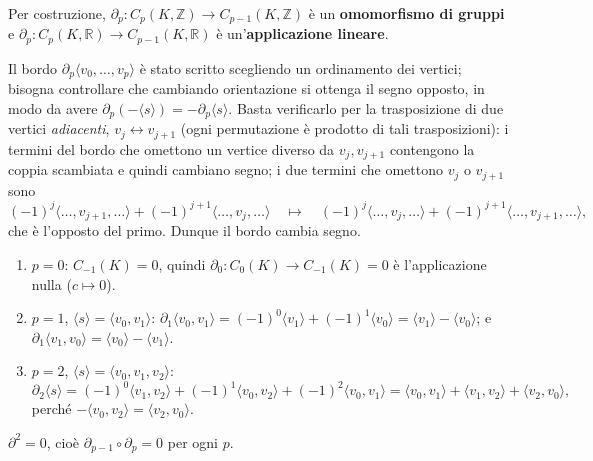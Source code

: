 Per costruzione, $\partial_p: C_p(K, \mathbb{Z}) \to C_{p-1}(K, \mathbb{Z})$ \`e un \textbf{omomorfismo di gruppi} e $\partial_p: C_p(K, \mathbb{R}) \to C_{p-1}(K, \mathbb{R})$ \`e un'\textbf{applicazione lineare}.

\begin{observacion}
Il bordo $\partial_p \langle v_0, \dots, v_p \rangle$ \`e stato scritto scegliendo un ordinamento dei vertici; bisogna controllare che cambiando orientazione si ottenga il segno opposto, in modo da avere $\partial_p(-\langle s \rangle) = -\partial_p \langle s \rangle$. Basta verificarlo per la trasposizione di due vertici \emph{adiacenti}, $v_j \leftrightarrow v_{j+1}$ (ogni permutazione \`e prodotto di tali trasposizioni): i termini del bordo che omettono un vertice diverso da $v_j, v_{j+1}$ contengono la coppia scambiata e quindi cambiano segno; i due termini che omettono $v_j$ o $v_{j+1}$ sono
\[
(-1)^j \langle \dots, v_{j+1}, \dots \rangle + (-1)^{j+1} \langle \dots, v_j, \dots \rangle \quad \longmapsto \quad (-1)^j \langle \dots, v_j, \dots \rangle + (-1)^{j+1} \langle \dots, v_{j+1}, \dots \rangle ,
\]
che \`e l'opposto del primo. Dunque il bordo cambia segno.
\end{observacion}

\begin{ejemplo}
\begin{enumerate}
    \item $p = 0$: $C_{-1}(K) = 0$, quindi $\partial_0: C_0(K) \to C_{-1}(K) = 0$ \`e l'applicazione nulla ($c \mapsto 0$).
    \item $p = 1$, $\langle s \rangle = \langle v_0, v_1 \rangle$: $\partial_1 \langle v_0, v_1 \rangle = (-1)^0 \langle v_1 \rangle + (-1)^1 \langle v_0 \rangle = \langle v_1 \rangle - \langle v_0 \rangle$; e $\partial_1 \langle v_1, v_0 \rangle = \langle v_0 \rangle - \langle v_1 \rangle$.
    \item $p = 2$, $\langle s \rangle = \langle v_0, v_1, v_2 \rangle$:
    \[
    \partial_2 \langle s \rangle = (-1)^0 \langle v_1, v_2 \rangle + (-1)^1 \langle v_0, v_2 \rangle + (-1)^2 \langle v_0, v_1 \rangle = \langle v_0, v_1 \rangle + \langle v_1, v_2 \rangle + \langle v_2, v_0 \rangle,
    \]
    perch\'e $-\langle v_0, v_2 \rangle = \langle v_2, v_0 \rangle$.
\end{enumerate}
\end{ejemplo}

\begin{lema}
$\partial^2 = 0$, cio\`e $\partial_{p-1} \circ \partial_p = 0$ per ogni $p$.
\end{lema}

